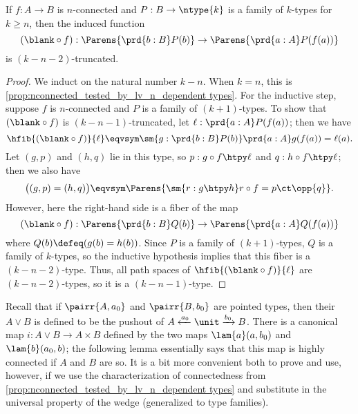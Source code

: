 {\begin{lem}\label{thm:conn-trunc-variable-ind}
  If $f:A\to B$ is $n$-connected and $P:B\to \ntype{k}$ is a family of $k$-types for $k\ge n$, then the induced function
  \[ (\blank\circ f) : \Parens{\prd{b:B} P(b)} \to \Parens{\prd{a:A} P(f(a)) } \]
  is $(k-n-2)$-truncated.
\end{lem}
\begin{proof}
  We induct on the natural number $k-n$.
  When $k=n$, this is \cref{prop:nconnected_tested_by_lv_n_dependent types}.
  For the inductive step, suppose $f$ is $n$-connected and $P$ is a family of $(k+1)$-types.
  To show that $(\blank\circ f)$ is $(k-n-1)$-truncated, let $\ell:\prd{a:A} P(f(a))$; then we have
  \[ \hfib{(\blank\circ f)}{\ell} \eqvsym \sm{g:\prd{b:B} P(b)} \prd{a:A} g(f(a)) = \ell(a).\]
  Let $(g,p)$ and $(h,q)$ lie in this type, so $p:g\circ f \htpy \ell$ and $q:h\circ f \htpy \ell$; then we also have
  \[ \big((g,p) = (h,q)\big) \eqvsym
  \Parens{\sm{r:g\htpy h} r\circ f = p \ct \opp{q}}.
  \]
  However, here the right-hand side is a fiber of the map
  \[ (\blank\circ f) : \Parens{\prd{b:B} Q(b)} \to \Parens{\prd{a:A} Q(f(a)) } \]
  where $Q(b) \defeq (g(b)=h(b))$.
  Since $P$ is a family of $(k+1)$-types, $Q$ is a family of $k$-types, so the inductive hypothesis implies that this fiber is a $(k-n-2)$-type.
  Thus, all path spaces of $\hfib{(\blank\circ f)}{\ell}$ are $(k-n-2)$-types, so it is a $(k-n-1)$-type.
\end{proof}

Recall that if $\pairr{A,a_0}$ and $\pairr{B,b_0}$ are pointed types, then
their 
%
$A\vee B$ is defined to be the pushout of $A\xleftarrow{a_0}
\unit\xrightarrow{b_0} B$.
There is a canonical map $i:A\vee B \to A\times B$ defined by the two maps $\lam{a} (a,b_0)$ and $\lam{b} (a_0,b)$; the following lemma essentially says that this map is highly connected if $A$ and $B$ are so.
It is a bit more convenient both to prove and use, however, if we use the characterization of connectedness from \cref{prop:nconnected_tested_by_lv_n_dependent types} and substitute in the universal property of the wedge (generalized to type families).

}

